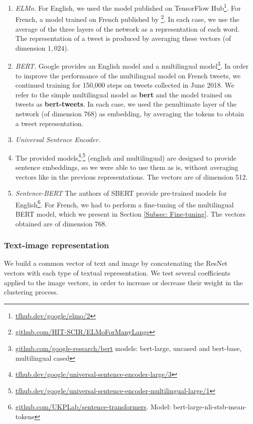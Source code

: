 \begin{enumerate}
\item \textit{ELMo.} For English, we used the model published on TensorFlow Hub\footnote{\url{tfhub.dev/google/elmo/2}}. For French, a model trained on French published by \citet{che2018towards}\footnote{\url{github.com/HIT-SCIR/ELMoForManyLangs}}. In each case, we use the average of the three layers of the network as a representation of each word. The representation of a tweet is produced by averaging these vectors (of dimension $1,024$).


\item \textit{BERT.} Google provides an English model and a multilingual model\footnote{\url{github.com/google-research/bert} models: bert-large, uncased and bert-base, multilingual cased}. In order to improve the performance of the multilingual model on French tweets, we continued training for 150,000 steps on tweets collected in June 2018. We refer to the simple multilingual model as \textbf{bert} and the model trained on tweets as \textbf{bert-tweets}. In each case, we used the penultimate layer of the network (of dimension 768) as embedding, by averaging the tokens to obtain a tweet representation.

\item \textit{Universal Sentence Encoder.}
    \item The provided models\footnote{\url{tfhub.dev/google/universal-sentence-encoder-large/3}}\textsuperscript{,}\footnote{\url{tfhub.dev/google/universal-sentence-encoder-multilingual-large/1}}
    (english and multilingual) are designed to provide sentence embeddings, so we were able to use them as is, without averaging vectors
    like in the previous representations. The vectors are of dimension 512.

\item \textit{Sentence-BERT} The authors of SBERT provide pre-trained models for English\footnote{\url{github.com/UKPLab/sentence-transformers}. Model: bert-large-nli-stsb-mean-tokens}. For French, we had to perform a fine-tuning of the multilingual BERT model, which we present in Section \ref{Subsec: Fine-tuning}. The vectors obtained are of dimension 768.
\end{enumerate}

\subsubsection{Text-image representation}

We build a common vector of text and image by concatenating the ResNet vectors with each type of textual representation. We test several coefficients applied to the image vectors, in order to increase or decrease their weight in the clustering process.


